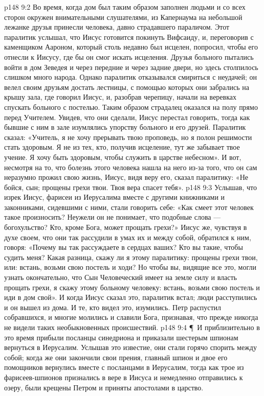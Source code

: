 \vs p148 9:2 Во время, когда дом был таким образом заполнен людьми и со всех сторон окружен внимательными слушателями, из Капернаума на небольшой лежанке друзья принесли человека, давно страдавшего параличом. Этот паралитик услышал, что Иисус готовится покинуть Вифсаиду, и, переговорив с каменщиком Аароном, который столь недавно был исцелен, попросил, чтобы его отнесли к Иисусу, где бы он смог искать исцеления. Друзья больного пытались войти в дом Зеведея и через передние и через задние двери, но здесь столпилось слишком много народа. Однако паралитик отказывался смириться с неудачей; он велел своим друзьям достать лестницы, с помощью которых они забрались на крышу зала, где говорил Иисус, и, разобрав черепицу, начали на веревках спускать больного с постелью. Таким образом страдалец оказался на полу прямо перед Учителем. Увидев, что они сделали, Иисус перестал говорить, тогда как бывшие с ним в зале изумлялись упорству больного и его друзей. Паралитик сказал: «Учитель, я не хочу прерывать твою проповедь, но я полон решимости стать здоровым. Я не из тех, кто, получив исцеление, тут же забывает твое учение. Я хочу быть здоровым, чтобы служить в царстве небесном». И вот, несмотря на то, что болезнь этого человека нашла на него из\hyp{}за того, что он сам неразумно прожил свою жизнь, Иисус, видя веру его, сказал паралитику: «Не бойся, сын; прощены грехи твои. Твоя вера спасет тебя».
\vs p148 9:3 Услышав, что изрек Иисус, фарисеи из Иерусалима вместе с другими книжниками и законниками, сидевшими с ними, стали говорить себе: «Как смеет этот человек такое произносить? Неужели он не понимает, что подобные слова --- богохульство? Кто, кроме Бога, может прощать грехи?» Иисус же, чувствуя в духе своем, что они так рассудили в умах их и между собой, обратился к ним, говоря: «Почему вы так рассуждаете в сердцах ваших? Кто вы такие, чтобы судить меня? Какая разница, скажу ли я этому паралитику: прощены грехи твои, или: встань, возьми свою постель и ходи? Но чтобы вы, видящие все это, могли узнать окончательно, что Сын Человеческий имеет на земле силу и власть прощать грехи, я скажу этому больному человеку: встань, возьми свою постель и иди в дом свой». И когда Иисус сказал это, паралитик встал; люди расступились и он вышел из дома. И те, кто видел это, изумились. Петр распустил собравшихся, и многие молились и славили Бога, признавая, что прежде никогда не видели таких необыкновенных происшествий.
\vs p148 9:4 \P\ И приблизительно в это время прибыли посланцы синедриона и приказали шестерым шпионам вернуться в Иерусалим. Услышав это известие, они стали горячо спорить между собой; когда же они закончили свои прения, главный шпион и двое его помощников вернулись вместе с посланцами в Иерусалим, тогда как трое из фарисеев\hyp{}шпионов признались в вере в Иисуса и немедленно отправились к озеру, были крещены Петром и приняты апостолами в царство.
